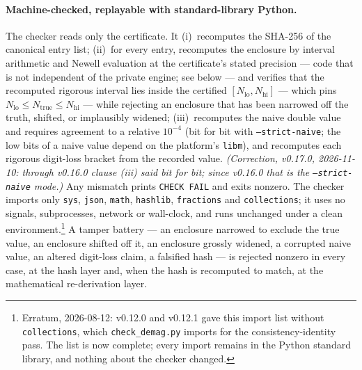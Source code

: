 \documentclass[11pt]{amsart}
\theoremstyle{plain}
\theoremstyle{definition}
\theoremstyle{remark}
\begin{document}
\paragraph{Machine-checked, replayable with standard-library Python.}
The checker reads only the certificate. It (i)~recomputes the SHA-256 of the
canonical entry list; (ii)~for every entry, recomputes the enclosure by interval
arithmetic and Newell evaluation at the certificate's stated precision --- code
that is not independent of the private engine; see below --- and verifies that
the recomputed rigorous interval lies inside the
certified $[N_{\mathrm{lo}},N_{\mathrm{hi}}]$ --- which pins
$N_{\mathrm{lo}}\le N_{\mathrm{true}}\le N_{\mathrm{hi}}$ --- while rejecting an
enclosure that has been narrowed off the truth, shifted, or implausibly widened;
(iii)~recomputes the naive double value and requires agreement to a relative
$10^{-4}$ (bit for bit with \texttt{--strict-naive}; the low bits of a naive value
depend on the platform's \texttt{libm}), and recomputes each rigorous digit-loss
bracket from the recorded value. \emph{(Correction, v0.17.0, 2026-11-10: through
v0.16.0 clause (iii) said bit for bit; since v0.16.0 that is the
\texttt{--strict-naive} mode.)} Any mismatch prints \texttt{CHECK FAIL} and exits
nonzero. The checker
imports only \texttt{sys}, \texttt{json}, \texttt{math}, \texttt{hashlib},
\texttt{fractions} and \texttt{collections}; it uses no signals, subprocesses,
network or wall-clock, and
runs unchanged under a clean environment.\footnote{Erratum, 2026-08-12: v0.12.0 and v0.12.1 gave this import list without
\texttt{collections}, which \texttt{check\_demag.py} imports for the
consistency-identity pass. The list is now complete; every import remains in the
Python standard library, and nothing about the checker changed.} A tamper
battery --- an enclosure
narrowed to exclude the true value, an enclosure shifted off it, an enclosure
grossly widened, a corrupted naive value, an altered digit-loss claim, a
falsified hash --- is rejected nonzero in every case, at the hash layer and, when
the hash is recomputed to match, at the mathematical re-derivation layer.
\end{document}

